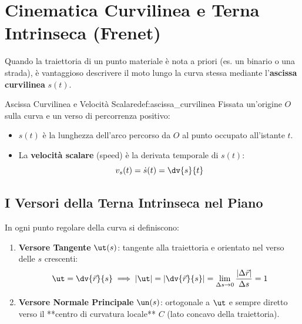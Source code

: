 \section{Cinematica Curvilinea e Terna Intrinseca (Frenet)}
\label{sec:terna_intrinseca}

Quando la traiettoria di un punto materiale è nota a priori (es. un binario o una strada), è vantaggioso descrivere il moto lungo la curva stessa mediante l'\textbf{ascissa curvilinea} $s(t)$.

\begin{definizione}{Ascissa Curvilinea e Velocità Scalare}{def:ascissa_curvilinea}
Fissata un'origine $O$ sulla curva e un verso di percorrenza positivo:
\begin{itemize}
    \item $s(t)$ è la lunghezza dell'arco percorso da $O$ al punto occupato all'istante $t$.
    \item La \textbf{velocità scalare} (speed) è la derivata temporale di $s(t)$:
    \begin{equation}
        v_s(t) = \dot{s}(t) = \dv{s}{t}
    \end{equation}
\end{itemize}
\end{definizione}

\subsection{I Versori della Terna Intrinseca nel Piano}
In ogni punto regolare della curva si definiscono:
\begin{enumerate}
    \item \textbf{Versore Tangente} $\ut(s)$: tangente alla traiettoria e orientato nel verso delle $s$ crescenti:
    \begin{equation}
        \ut = \dv{\vec{r}}{s} \implies |\ut| = \left|\dv{\vec{r}}{s}\right| = \lim_{\Delta s \to 0} \frac{|\Delta\vec{r}|}{\Delta s} = 1
    \end{equation}
    \item \textbf{Versore Normale Principale} $\un(s)$: ortogonale a $\ut$ e sempre diretto verso il **centro di curvatura locale** $C$ (lato concavo della traiettoria).
\end{enumerate}

